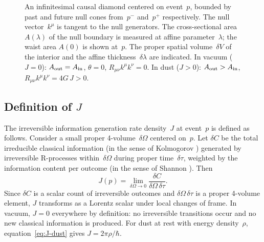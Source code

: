 \documentclass[12pt]{article}
\begin{document}
\begin{figure}[h]
\caption{An infinitesimal causal diamond centered on event~$p$,
  bounded by past and future null cones from~$p^-$ and~$p^+$
  respectively.
  The null vector~$k^\mu$ is tangent to the null generators.
  The cross-sectional area~$A(\lambda)$ of the null boundary
  is measured at affine parameter~$\lambda$; the waist area
  $A(0)$ is shown at~$p$.
  The proper spatial volume~$\delta V$ of the interior and the
  affine thickness~$\delta\lambda$ are indicated.
  In vacuum ($J=0$): $A_{\rm out} = A_{\rm in}$, $\theta=0$,
  $R_{\mu\nu}k^\mu k^\nu = 0$.
  In dust ($J>0$): $A_{\rm out} > A_{\rm in}$,
  $R_{\mu\nu}k^\mu k^\nu = 4G\,J > 0$.}
\label{fig:diamond}
\end{figure}

\subsection{Definition of $J$}

The irreversible information generation rate density~$J$ at
event~$p$ is defined as follows.
Consider a small proper 4-volume~$\delta\Omega$ centered on~$p$.
Let $\delta C$ be the total irreducible classical information
(in the sense of Kolmogorov \cite{Kolmogorov1965}) generated
by irreversible R-processes within~$\delta\Omega$ during proper
time~$\delta\tau$, weighted by the information content per
outcome (in the sense of Shannon \cite{Shannon1948}).
Then
\begin{equation}
  J(p) = \lim_{\delta\Omega\to 0}
  \frac{\delta C}{\delta\Omega\,\delta\tau}. \label{eq:J-def}
\end{equation}
Since $\delta C$ is a scalar count of irreversible outcomes
and $\delta\Omega\,\delta\tau$ is a proper 4-volume element,
$J$ transforms as a Lorentz scalar under local changes of frame.
In vacuum, $J=0$ everywhere by definition: no irreversible
transitions occur and no new classical information is produced.
For dust at rest with energy density~$\rho$,
equation~\eqref{eq:J-dust} gives $J = 2\pi\rho/\hbar$.
\end{document}
